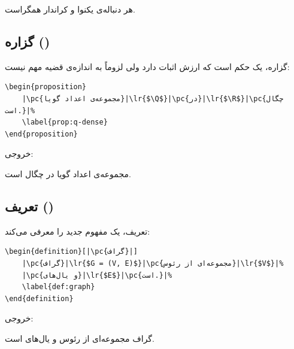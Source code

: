 \begin{corollary}
    هر دنباله‌ی یکنوا و کراندار همگراست.
    \label{cor:monotone-ch8}
\end{corollary}

\subsection{گزاره ()}
\label{sec:environments-proposition}

گزاره، یک حکم است که ارزش اثبات دارد ولی
لزوماً به اندازه‌ی قضیه مهم نیست:

\begin{latin}
\begin{verbatim}
\begin{proposition}
    |\pc{مجموعه‌ی اعداد گویا}|\lr{$\Q$}|\pc{در}|\lr{$\R$}|\pc{چگال است.}|%
    \label{prop:q-dense}
\end{proposition}
\end{verbatim}
\end{latin}

خروجی:

\begin{proposition}
    مجموعه‌ی اعداد گویا \lr{$\Q$} در \lr{$\R$}
    چگال است.
    \label{prop:q-dense-ch8}
\end{proposition}

\subsection{تعریف ()}
\label{sec:environments-definition}

تعریف، یک مفهوم جدید را معرفی می‌کند:

\begin{latin}
\begin{verbatim}
\begin{definition}[|\pc{گراف}|]
    |\pc{گراف}|\lr{$G = (V, E)$}|\pc{مجموعه‌ای از رئوس}|\lr{$V$}|%
    |\pc{و یال‌های}|\lr{$E$}|\pc{است.}|%
    \label{def:graph}
\end{definition}
\end{verbatim}
\end{latin}

خروجی:

\begin{definition}[گراف]
    گراف  مجموعه‌ای از رئوس
     و یال‌های  است.
    \label{def:graph-ch8}
\end{definition}



